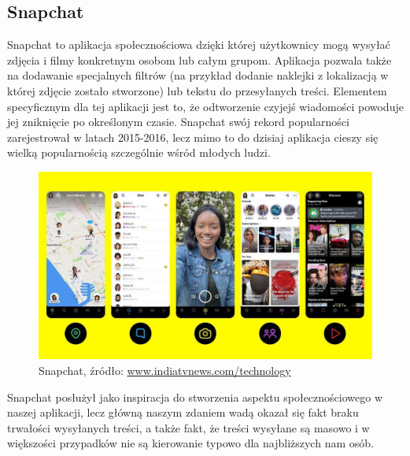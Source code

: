 \documentclass[a4paper,twoside,12pt]{book}
\begin{document}
\subsection{Snapchat}
Snapchat to aplikacja społecznościowa dzięki której użytkownicy mogą wysyłać zdjęcia i filmy konkretnym osobom lub całym grupom. Aplikacja pozwala także na dodawanie specjalnych filtrów (na przykład dodanie naklejki z lokalizacją w której zdjęcie zostało stworzone) lub tekstu do przesyłanych treści. Elementem specyficznym dla tej aplikacji jest to, że odtworzenie czyjejś wiadomości powoduje jej zniknięcie po określonym czasie.
Snapchat swój rekord popularności zarejestrował w latach 2015-2016, lecz mimo to do dzisiaj aplikacja cieszy się wielką popularnością szczególnie wśród młodych ludzi.
\begin{figure}[H]
    \centering
    \includegraphics[width=1\textwidth]{apki_ss/snapchat.jpg}
    \captionsetup{justification=centering}
    \caption{Snapchat, źródło: \href{https://www.indiatvnews.com/technology/news-snaphat-partner-summit-2020-new-snapchat-features-for-android-ios-see-what-they-are-625533}{www.indiatvnews.com/technology}}
\end{figure}
Snapchat posłużył jako inspiracja do stworzenia aspektu społecznościowego w naszej aplikacji, lecz główną naszym zdaniem wadą okazał się fakt braku trwałości wysyłanych treści, a także fakt, że treści wysyłane są masowo i w większości przypadków nie są kierowanie typowo dla najbliższych nam osób.

\newpage
\end{document}

